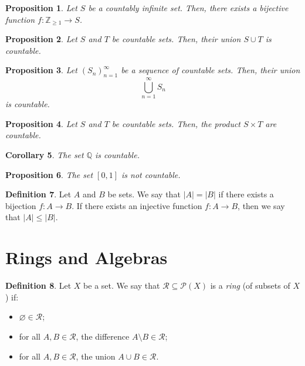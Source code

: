 \documentclass[a4paper, openany]{memoir}
\theoremstyle{definition}
\newtheorem{definition}{Definition}[section]
\theoremstyle{plain}
\newtheorem{proposition}[definition]{Proposition}
\newtheorem{corollary}[definition]{Corollary}
\begin{document}
    \begin{proposition}
        Let $S$ be a countably infinite set. Then, there exists a bijective function $f: \mathbb{Z}_{\geq 1} \to S$.
    \end{proposition}

    \begin{proposition}
        Let $S$ and $T$ be countable sets. Then, their union $S \cup T$ is countable.
    \end{proposition}

    \begin{proposition}
        Let $(S_n)_{n=1}^\infty$ be a sequence of countable sets. Then, their union 
        \[\bigcup_{n=1}^\infty S_n\]
        is countable.
    \end{proposition}

    \begin{proposition}
        Let $S$ and $T$ be countable sets. Then, the product $S \times T$ are countable.
    \end{proposition}

    \begin{corollary}
        The set $\mathbb{Q}$ is countable.
    \end{corollary}

    \begin{proposition}
        The set $[0, 1]$ is not countable.
    \end{proposition}

    \begin{definition}
        Let $A$ and $B$ be sets. We say that $|A| = |B|$ if there exists a bijection $f: A \to B$. If there exists an injective function $f: A \to B$, then we say that $|A| \leq |B|$.
    \end{definition}
    \newpage

    \section{Rings and Algebras}
    \begin{definition}
        Let $X$ be a set. We say that $\mathcal{R} \subseteq \mathcal{P}(X)$ is a \emph{ring} (of subsets of $X$) if:
        \begin{itemize}
            \item $\varnothing \in \mathcal{R}$;
            \item for all $A, B \in \mathcal{R}$, the difference $A \setminus B \in \mathcal{R}$;
            \item for all $A, B \in \mathcal{R}$, the union $A \cup B \in \mathcal{R}$.
        \end{itemize}
    \end{definition}
\end{document}
